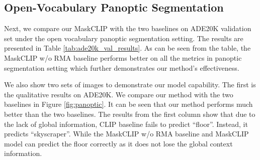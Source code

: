 \documentclass{article}
\theoremstyle{plain}
\theoremstyle{definition}
\theoremstyle{remark}
\begin{document}
\subsection{Open-Vocabulary Panoptic Segmentation}

\label{sec:quantitative_panoptic}

Next, we compare our MaskCLIP with the two baselines on ADE20K validation set under the open vocabulary panoptic segmentation setting. The results are presented in Table  \ref{tab:ade20k_val_results}. As can be seen from the table, the MaskCLIP w/o RMA baseline performs better on all the metrics in panoptic segmentation setting which further demonstrates our method's effectiveness.


We also show two sets of images to demonstrate our model capability. The first is the qualitative results on ADE20K. We compare our method with the two baselines in Figure \ref{fig:panoptic}. It can be seen that our method performs much better than the two baselines. The results from the first column show that due to the lack of global information, CLIP baseline fails to predict ``floor''. Instead, it predicts ``skyscraper''. 
While the MaskCLIP w/o RMA baseline and MaskCLIP model can predict the floor correctly as it does not lose the global context information.
\end{document}
